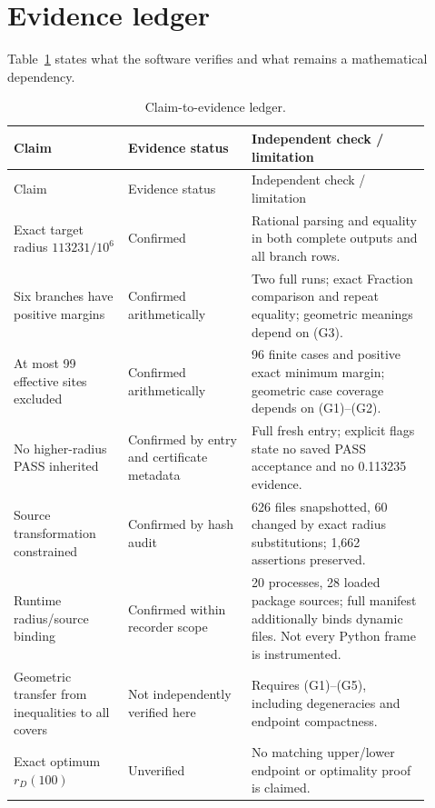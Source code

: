 \documentclass[11pt]{article}
\newcommand{\rd}{r_D}
\begin{document}
\section{Evidence ledger}
\label{app:ledger}
Table~\ref{tab:ledger} states what the software verifies and what remains a mathematical dependency.
\begin{longtable}{@{}p{0.25\linewidth}p{0.27\linewidth}p{0.39\linewidth}@{}}
\caption{Claim-to-evidence ledger.}\label{tab:ledger}\\
\toprule Claim & Evidence status & Independent check / limitation\\
\midrule
\endfirsthead
\toprule Claim & Evidence status & Independent check / limitation\\
\midrule
\endhead
Exact target radius $113231/10^6$ & Confirmed & Rational parsing and equality in both complete outputs and all branch rows.\\
Six branches have positive margins & Confirmed arithmetically & Two full runs; exact Fraction comparison and repeat equality; geometric meanings depend on (G3).\\
At most 99 effective sites excluded & Confirmed arithmetically & 96 finite cases and positive exact minimum margin; geometric case coverage depends on (G1)--(G2).\\
No higher-radius PASS inherited & Confirmed by entry and certificate metadata & Full fresh entry; explicit flags state no saved PASS acceptance and no 0.113235 evidence.\\
Source transformation constrained & Confirmed by hash audit & 626 files snapshotted, 60 changed by exact radius substitutions; 1,662 assertions preserved.\\
Runtime radius/source binding & Confirmed within recorder scope & 20 processes, 28 loaded package sources; full manifest additionally binds dynamic files. Not every Python frame is instrumented.\\
Geometric transfer from inequalities to all covers & Not independently verified here & Requires (G1)--(G5), including degeneracies and endpoint compactness.\\
Exact optimum $\rd(100)$ & Unverified & No matching upper/lower endpoint or optimality proof is claimed.\\
\bottomrule
\end{longtable}
\end{document}
